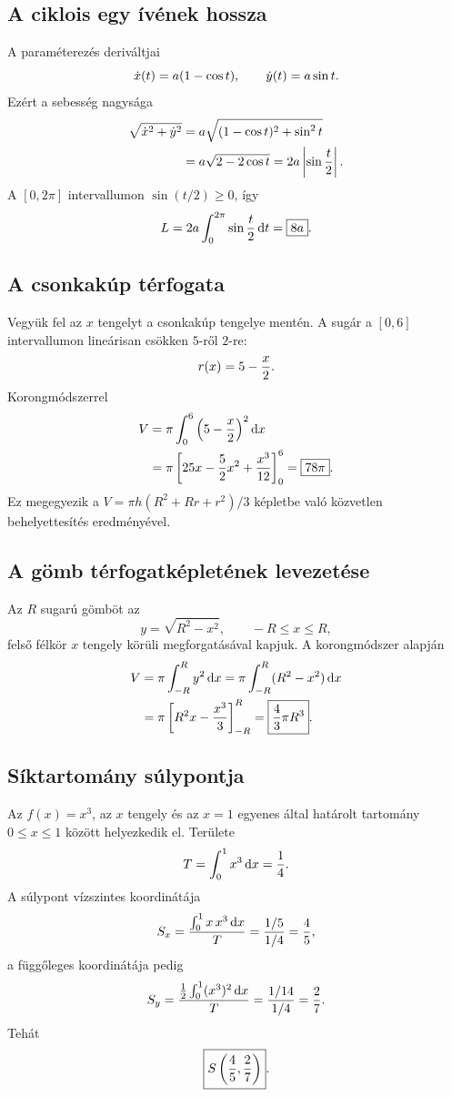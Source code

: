 \documentclass{szb-solution}
\begin{document}
\subsection{A ciklois egy ívének hossza}

A paraméterezés deriváltjai
$$
  \dot x(t)=a(1-\cos t),
  \qquad
  \dot y(t)=a\sin t
  \text.
$$
Ezért a sebesség nagysága
\begin{align*}
  \sqrt{\dot x^2+\dot y^2}
  &=a\sqrt{(1-\cos t)^2+\sin^2t}\\
  &=a\sqrt{2-2\cos t}
   =2a\left|\sin\frac t2\right|
  \text.
\end{align*}
A $[0,2\pi]$ intervallumon $\sin(t/2)\geq0$, így
$$
  L=2a\int_0^{2\pi}\sin\frac t2\mathop{}\!\mathrm{d} t
  =\boxed{8a}
  \text.
$$

\subsection{A csonkakúp térfogata}

Vegyük fel az $x$ tengelyt a csonkakúp tengelye mentén. A sugár a
$[0,6]$ intervallumon lineárisan csökken $5$-ről $2$-re:
$$
  r(x)=5-\frac{x}{2}
  \text.
$$
Korongmódszerrel
\begin{align*}
  V
  &=\pi\int_0^6\left(5-\frac x2\right)^2\mathop{}\!\mathrm{d} x\\
  &=\pi\left[25x-\frac52x^2+\frac{x^3}{12}\right]_0^6
  =\boxed{78\pi}
  \text.
\end{align*}
Ez megegyezik a
$V=\pi h(R^2+Rr+r^2)/3$ képletbe való közvetlen behelyettesítés
eredményével.

\subsection{A gömb térfogatképletének levezetése}

Az $R$ sugarú gömböt az
$$
  y=\sqrt{R^2-x^2},
  \qquad -R\leq x\leq R,
$$
felső félkör $x$ tengely körüli megforgatásával kapjuk. A korongmódszer
alapján
\begin{align*}
  V
  &=\pi\int_{-R}^{R}y^2\mathop{}\!\mathrm{d} x
    =\pi\int_{-R}^{R}(R^2-x^2)\mathop{}\!\mathrm{d} x\\
  &=\pi\left[R^2x-\frac{x^3}{3}\right]_{-R}^{R}
    =\boxed{\frac43\pi R^3}
  \text.
\end{align*}

\subsection{Síktartomány súlypontja}

Az $f(x)=x^3$, az $x$ tengely és az $x=1$ egyenes által határolt tartomány
$0\leq x\leq1$ között helyezkedik el. Területe
$$
  T=\int_0^1x^3\mathop{}\!\mathrm{d} x=\frac14
  \text.
$$
A súlypont vízszintes koordinátája
$$
  S_x=\frac{\int_0^1x\,x^3\mathop{}\!\mathrm{d} x}{T}
     =\frac{1/5}{1/4}=\frac45
  \text,
$$
a függőleges koordinátája pedig
$$
  S_y=\frac{\frac12\int_0^1(x^3)^2\mathop{}\!\mathrm{d} x}{T}
     =\frac{1/14}{1/4}=\frac27
  \text.
$$
Tehát
$$
  \boxed{S\left(\frac45,\frac27\right)}
  \text.
$$
\end{document}
